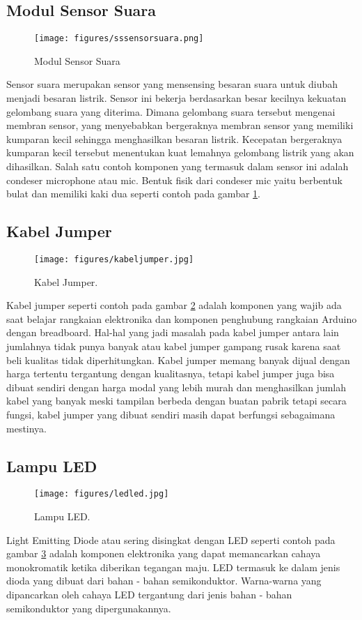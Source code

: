 \subsection{Modul Sensor Suara}
\begin{figure}[ht]
\centerline{\texttt{[image: figures/sssensorsuara.png]}}
\caption{Modul Sensor Suara}
\label{sssensorsuara}
\end{figure}
Sensor suara merupakan sensor yang mensensing besaran suara untuk diubah menjadi besaran listrik. Sensor ini bekerja berdasarkan besar kecilnya kekuatan gelombang suara yang diterima. Dimana gelombang suara tersebut mengenai membran sensor, yang menyebabkan bergeraknya membran sensor yang memiliki kumparan kecil sehingga menghasilkan besaran listrik. Kecepatan bergeraknya kumparan kecil tersebut menentukan kuat lemahnya gelombang listrik yang akan dihasilkan. Salah satu contoh komponen yang termasuk dalam sensor ini adalah condeser microphone atau mic. Bentuk fisik dari condeser mic yaitu berbentuk bulat dan memiliki kaki dua seperti contoh pada gambar \ref{sssensorsuara}.
\subsection{Kabel Jumper}
\begin{figure}[ht]
\centerline{\texttt{[image: figures/kabeljumper.jpg]}}
\caption{Kabel Jumper.}
\label{kabeljumper}
\end{figure}
Kabel jumper seperti contoh pada gambar \ref{kabeljumper} adalah komponen yang wajib ada saat belajar rangkaian elektronika dan komponen penghubung rangkaian Arduino dengan breadboard. Hal-hal yang jadi masalah pada kabel jumper antara lain jumlahnya tidak punya banyak atau kabel jumper gampang rusak karena saat beli kualitas tidak diperhitungkan.
Kabel jumper memang banyak dijual dengan harga tertentu tergantung dengan kualitasnya, tetapi kabel jumper juga bisa dibuat sendiri dengan harga modal yang lebih murah dan menghasilkan jumlah kabel yang banyak meski tampilan berbeda dengan buatan pabrik tetapi secara fungsi, kabel jumper yang dibuat sendiri masih dapat berfungsi sebagaimana mestinya.

\subsection{Lampu LED}
\begin{figure}[ht]
\centerline{\texttt{[image: figures/ledled.jpg]}}
\caption{Lampu LED.}
\label{ssuaraled}
\end{figure}
Light Emitting Diode atau sering disingkat dengan LED seperti contoh pada gambar \ref{ssuaraled} adalah komponen elektronika yang dapat memancarkan  cahaya monokromatik ketika diberikan tegangan maju. LED termasuk ke dalam jenis dioda yang dibuat dari bahan - bahan semikonduktor. Warna-warna yang dipancarkan oleh cahaya LED tergantung dari jenis bahan - bahan semikonduktor yang dipergunakannya.


